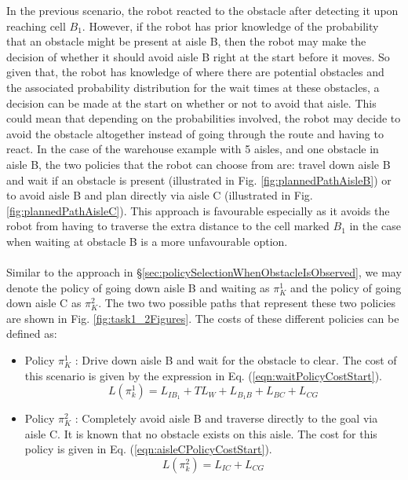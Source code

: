 \documentclass[a4paper,12pt]{article}
\begin{document}
			In the previous scenario, the robot reacted to the obstacle after detecting it upon reaching cell $ B_1 $. However, if the robot has prior knowledge of the probability that an obstacle might be present at aisle B, then the robot may make the decision of whether it should avoid aisle B right at the start before it moves. So given that, the robot has knowledge of where there are potential obstacles and the associated probability distribution for the wait times at these obstacles, a decision can be made at the start on whether or not to avoid that aisle. This could mean that depending on the probabilities involved, the robot may decide to avoid the obstacle altogether instead of going through the route and having to react. In the case of the warehouse example with 5 aisles, and one obstacle in aisle B, the two policies that the robot can choose from are: travel down aisle B and wait if an obstacle is present (illustrated in Fig. \ref{fig:plannedPathAisleB}) or to avoid aisle B and plan directly via aisle C (illustrated in Fig. \ref{fig:plannedPathAisleC}). This approach is favourable especially as it avoids the robot from having to traverse the extra distance to the cell marked $B_1$ in the case when waiting at obstacle B is a more unfavourable option.
			\\
			\\
			Similar to the approach in \S \ref{sec:policySelectionWhenObstacleIsObserved}, we may denote the policy of going down aisle B and waiting as $\pi_{K}^{1}$ and the policy of going down aisle C as $\pi_{K}^{2}$. The two two possible paths that represent these two policies are shown in Fig. \ref{fig:task1_2Figures}. The costs of these different policies can be defined as:
			\begin{itemize}
				\item Policy $\pi_{K}^{1}$ : Drive down aisle B and wait for the obstacle to clear. The cost of this scenario is given by the expression in Eq. (\ref{eqn:waitPolicyCostStart}).
				\begin{equation}
				L(\pi_k^1) = L_{IB_1}+TL_W+L_{B_1B}+L_{BC}+L_{CG}
				\label{eqn:waitPolicyCostStart}
				\end{equation}
				\item Policy $\pi_{K}^{2}$ : Completely avoid aisle B and traverse directly to the goal via aisle C. It is known that no obstacle exists on this aisle. The cost for this policy is given in Eq. (\ref{eqn:aisleCPolicyCostStart}).
				\begin{equation}
				L(\pi_k^2) = L_{IC}+L_{CG}
				\label{eqn:aisleCPolicyCostStart}
				\end{equation}
			\end{itemize}
			
\end{document}
